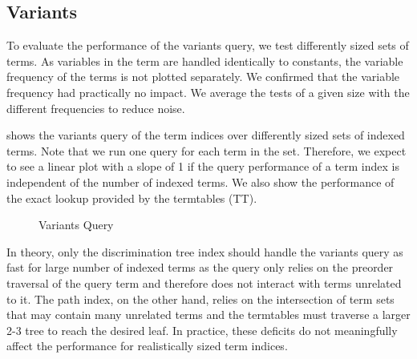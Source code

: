 \subsection{Variants}
To evaluate the performance of the variants query, we test differently sized sets of terms. As variables in the term are handled identically to constants, the variable frequency of the terms is not plotted separately. We confirmed that the variable frequency had practically no impact. We average the tests of a given size with the different frequencies to reduce noise.

 shows the variants query of the term indices over differently sized sets of indexed terms. Note that we run one query for each term in the set. Therefore, we expect to see a linear plot with a slope of 1 if the query performance of a term index is independent of the number of indexed terms. We also show the performance of the exact lookup provided by the termtables (TT).

\begin{figure}
  \centering
{}
\caption{Variants Query}
\label{variants}
\end{figure}

In theory, only the discrimination tree index should handle the variants query as fast for large number of indexed terms as the query only relies on the preorder traversal of the query term and therefore does not interact with terms unrelated to it.
The path index, on the other hand, relies on the intersection of term sets that may contain many unrelated terms and the termtables must traverse a larger 2-3 tree to reach the desired leaf. In practice, these deficits do not meaningfully affect the performance for realistically sized term indices.

